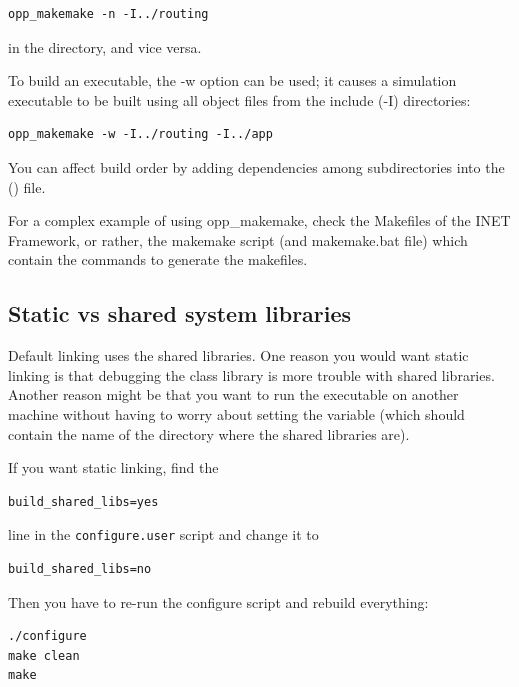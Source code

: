\begin{verbatim}
opp_makemake -n -I../routing
\end{verbatim}

in the  directory, and vice versa.

To build an executable, the -w option can be used; it causes a simulation
executable to be built using all object files from the include (-I) directories:

\begin{verbatim}
opp_makemake -w -I../routing -I../app
\end{verbatim}

You can affect build order by adding dependencies among subdirectories
into the  () file.

For a complex example of using opp\_makemake, check the Makefiles
of the INET Framework, or rather, the makemake script (and makemake.bat file)
which contain the commands to generate the makefiles.



\subsection{Static vs shared {\opp} system libraries}

Default linking uses the shared libraries. One
reason you would want static linking is that
debugging the {\opp} class library is more trouble
with shared libraries. Another reason might be that you want to run
the executable on another machine without having to worry about
setting the  variable (which should contain the name
of the directory where the {\opp} shared libraries are).

If you want static linking, find the

\begin{verbatim}
build_shared_libs=yes
\end{verbatim}


line in the \texttt{configure.user} script and change it to

\begin{verbatim}
build_shared_libs=no
\end{verbatim}

Then you have to re-run the configure script and rebuild everything:

\begin{verbatim}
./configure
make clean
make
\end{verbatim}



